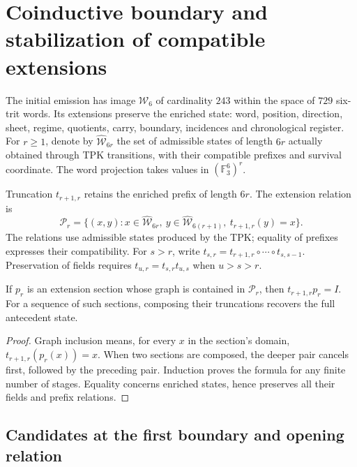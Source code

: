 \section{Coinductive boundary and stabilization of compatible extensions}
\label{scope:g9-frontera}

The initial emission has image $\mathcal W_6$ of cardinality $243$ within the space of $729$ six-trit words. Its extensions preserve the enriched state: word, position, direction, sheet, regime, quotients, carry, boundary, incidences and chronological register. For $r\ge1$, denote by $\widehat{\mathcal W}_{6r}$ the set of admissible states of length $6r$ actually obtained through TPK transitions, with their compatible prefixes and survival coordinate. The word projection takes values in $(\mathbb F_3^6)^r$.

Truncation $t_{r+1,r}$ retains the enriched prefix of length $6r$. The extension relation is
\[
 \mathcal P_r=\{(x,y):x\in\widehat{\mathcal W}_{6r},\
 y\in\widehat{\mathcal W}_{6(r+1)},\ t_{r+1,r}(y)=x\}.
\]
The relations use admissible states produced by the TPK; equality of prefixes expresses their compatibility. For $s>r$, write $t_{s,r}=t_{r+1,r}\circ\cdots\circ t_{s,s-1}$. Preservation of fields requires $t_{u,r}=t_{s,r}t_{u,s}$ when $u>s>r$.

\begin{proposition}
If $p_r$ is an extension section whose graph is contained in $\mathcal P_r$, then $t_{r+1,r}p_r=I$. For a sequence of such sections, composing their truncations recovers the full antecedent state.
\end{proposition}
\begin{proof}
Graph inclusion means, for every $x$ in the section's domain, $t_{r+1,r}(p_r(x))=x$. When two sections are composed, the deeper pair cancels first, followed by the preceding pair. Induction proves the formula for any finite number of stages. Equality concerns enriched states, hence preserves all their fields and prefix relations.
\end{proof}

\subsection{Candidates at the first boundary and opening relation}

